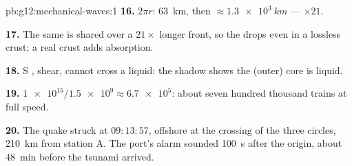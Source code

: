 \begin{solution}{pb:g12:mechanical-waves:1}
\textbf{16.} $2\pi r$: \qty{63}{km}, then $\approx \qty{1.3e3}{km}$
--- $\times 21$.

\textbf{17.} The same  is shared over a $21\times$ longer
front, so the  drops even in a lossless crust; a real crust
adds absorption.

\textbf{18.} S ,  shear, cannot cross a liquid: the
 shadow shows the (outer) core is liquid.

\textbf{19.} $\num{1e15}/\num{1.5e9} \approx \num{6.7e5}$: about
seven hundred thousand trains at full speed.

\textbf{20.} The quake struck at $09{:}13{:}57$, offshore at the
crossing of the three circles, \qty{210}{km} from station A. The
port's  alarm sounded \qty{100}{s} after the origin, about
\qty{48}{min} before the tsunami arrived.
\end{solution}
